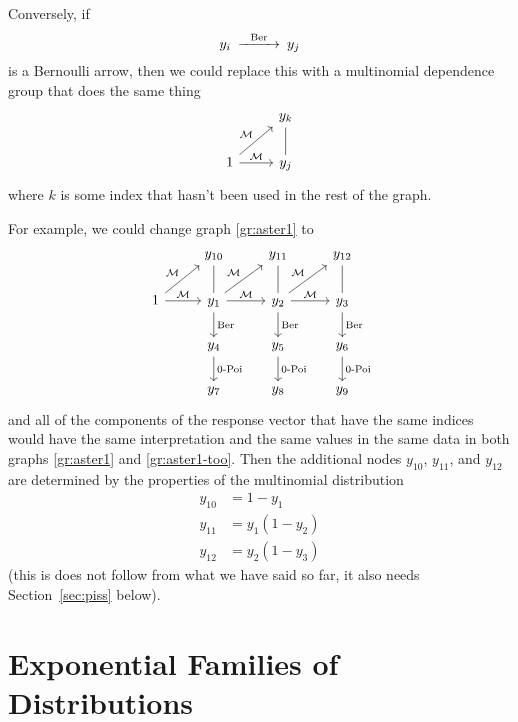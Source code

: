 Conversely, if
$$
\begin{CD}
   y_i @>\text{Ber}>> y_j
\end{CD}
$$
is a Bernoulli arrow, then we could replace this with a multinomial dependence
group that does the same thing
$$
\begin{tikzcd}
  \hphantom{1} & y_k
  \\
  1
  \arrow{r}{\mathcal{M}}
  \arrow{ru}{\mathcal{M}}
  & y_j
  \arrow[dash]{u}
\end{tikzcd}
$$
where $k$ is some index that hasn't been used in the rest of the graph.

For example, we could change graph \eqref{gr:aster1} to
\begin{equation} \label{gr:aster1-too}
\begin{tikzcd}
  \hphantom{1} & y_{10} & y_{11} & y_{12}
  \\
  1
  \arrow{r}{\mathcal{M}}
  \arrow{ru}{\mathcal{M}}
  & y_1
  \arrow[dash]{u}
  \arrow{d}{\text{Ber}}
  \arrow{r}{\mathcal{M}}
  \arrow{ru}{\mathcal{M}}
  & y_2
  \arrow[dash]{u}
  \arrow{d}{\text{Ber}}
  \arrow{r}{\mathcal{M}}
  \arrow{ru}{\mathcal{M}}
  & y_3
  \arrow[dash]{u}
  \arrow{d}{\text{Ber}}
  \\
  \hphantom{1} & y_4 \arrow{d}{\text{0-Poi}}
  & y_5 \arrow{d}{\text{0-Poi}}
  & y_6 \arrow{d}{\text{0-Poi}}
  \\
  \hphantom{1} & y_7 & y_8 & y_9
\end{tikzcd}
\end{equation}
and all of the components of the response vector that have the same indices
would have the same interpretation and the same values in the same data
in both graphs \eqref{gr:aster1} and \eqref{gr:aster1-too}.
Then the additional nodes $y_{10}$, $y_{11}$, and $y_{12}$ are determined
by the properties of the multinomial distribution
\begin{align*}
   y_{10} & = 1 - y_1
   \\
   y_{11} & = y_1 (1 - y_2)
   \\
   y_{12} & = y_2 (1 - y_3)
\end{align*}
(this is does not follow from what we have said so far, it also needs
Section~\ref{sec:piss} below).

\section{Exponential Families of Distributions}

